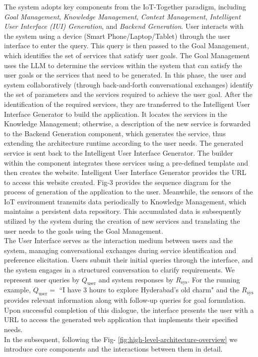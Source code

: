 The system adopts key components from the IoT-Together paradigm, including \textit{Goal Management}, \textit{Knowledge Management}, \textit{Context Management}, \textit{Intelligent User Interface (IUI) Generation}, and \textit{Backend Generation}. User interacts with the system using a device (Smart Phone/Laptop/Tablet) through the user interface to enter the query. This query is then passed to the Goal Management, which identifies the set of services that satisfy user goals. The Goal Management uses the LLM to determine the services within the system that can satisfy the user goals or the services that need to be generated. In this phase, the user and system collaboratively (through back-and-forth conversational exchanges) identify the set of parameters and the services required to achieve the user goal.
After the identification of the required services, they are transferred to the Intelligent User Interface Generator to build the application. It locates the services in the Knowledge Management; otherwise, a description of the new service is forwarded to the Backend Generation component, which generates the service, thus extending the architecture runtime according to the user needs. The generated service is sent back to the Intelligent User Interface Generator. The builder within the component integrates these services using a pre-defined template and then creates the website. Intelligent User Interface Generator provides the URL to access this website created. Fig-3 provides the sequence diagram for the process of generation of the application to the user. Meanwhile, the sensors of the IoT environment transmits data periodically to Knowledge Management, which maintains a persistent data repository. This accumulated data is subsequently utilized by the system during the creation of new services and translating the user needs to the goals using the Goal Management.
\\
The User Interface serves as the interaction medium between users and the system, managing conversational exchanges during service identification and preference elicitation. Users submit their initial queries through the interface, and the system engages in a structured conversation to clarify requirements. We represent user queries by $Q_\text{user}$ and system responses by $R_\text{sys}$. For the running example, $Q_\text{user} =$ ``I have 3 hours to explore Hyderabad's old charm" and the $R_\text{sys}$ provides relevant information along with follow-up queries for goal formulation.
Upon successful completion of this dialogue, the interface presents the user with a URL to access the generated web application that implements their specified needs.\\
In the subsequent, following the Fig- \ref{fig:high-level-architecture-overview} we introduce core components and the interactions between them in detail.